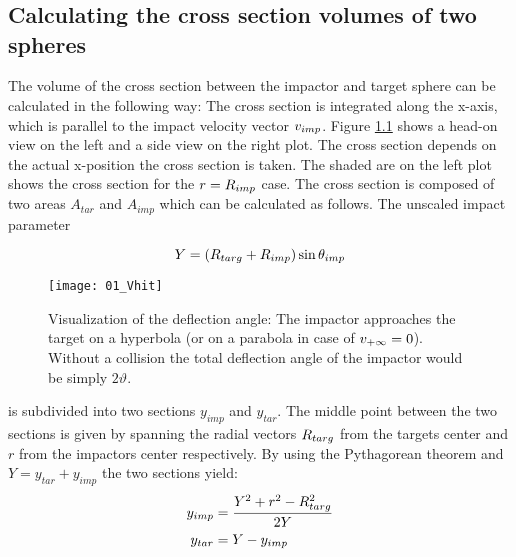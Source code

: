 \cleardoublepage
\graphicspath{{./07figs/}}

\chapter{}
\vspace{-1.0cm}

\section{Calculating the cross section volumes of two spheres}
\label{ch07_sec01}
The volume of the cross section between the impactor and target sphere can be calculated in the following way: The cross section is integrated along the x-axis, which is parallel to the impact velocity vector $v_{imp}$. Figure \ref{ch07_fig01} shows a head-on view on the left and a side view on the right plot. The cross section depends on the actual x-position the cross section is taken. The shaded are on the left plot shows the cross section for the $r = R_{imp}$ case. The cross section is composed of two areas $A_{tar}$ and $A_{imp}$ which can be calculated as follows. The unscaled impact parameter 

\begin{equation}
\label{ch07_sec01_eq001}
Y = ( R_{targ} + R_{imp} ) \sin{ \theta_{imp}} 
\end{equation}

\begin{figure}[htbp]
\begin{center}
\texttt{[image: 01\_Vhit]}
\caption{Visualization of the deflection angle: The impactor approaches the target on a hyperbola (or on a parabola in case of $v_{+\infty} = 0$). Without a collision the total deflection angle of the impactor would be simply $2 \vartheta$.}
\label{ch07_fig01}
\end{center}
\end{figure}

is subdivided into two sections $y_{imp}$ and $y_{tar}$. The middle point between the two sections is given by spanning the radial vectors $R_{targ}$ from the targets center and $r$ from the impactors center respectively.    By using the Pythagorean theorem and $Y = y_{tar} + y_{imp}$ the two sections yield:
\begin{align}
\label{ch07_sec01_eq002}
y_{imp} &= \frac{Y^2 + r^2 - R_{targ}^2}{2 Y} \\
y_{tar} &= Y - y_{imp}
\end{align}

